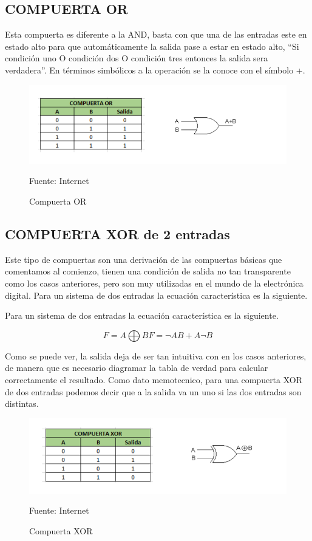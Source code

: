 \subsection{COMPUERTA OR}
Esta compuerta es diferente a la AND, basta con que una de las entradas este en estado alto para que automáticamente la salida pase a estar en estado alto, “Si condición uno O condición dos O condición tres entonces la salida sera verdadera”. En términos simbólicos a la operación se la conoce con el símbolo +.

\begin{figure}[H]
    \centering
    \includegraphics[scale = 0.7]{Imagenes/OR.png}
    \caption{Compuerta OR}{Fuente: Internet}
\end{figure}

\subsection{COMPUERTA XOR de 2 entradas}

Este tipo de compuertas son una derivación de las compuertas básicas que comentamos al comienzo, tienen una condición de salida no tan transparente como los casos anteriores, pero son muy utilizadas en el mundo de la electrónica digital.
Para un sistema de dos entradas la ecuación característica es la siguiente.

Para un sistema de dos entradas la ecuación característica es la siguiente.

\begin{equation}
    F = A \bigoplus B
    F = \neg A B +  A \neg B
\end{equation}

Como se puede ver, la salida deja de ser tan intuitiva con en los casos anteriores, de manera que es necesario diagramar la tabla de verdad para calcular correctamente el resultado.
Como dato memotecnico, para una compuerta XOR de dos entradas podemos decir que a la salida va un uno si las dos entradas son distintas.

\begin{figure}[H]
    \centering
    \includegraphics[scale = 0.70]{Imagenes/XOR.png}
    \caption{Compuerta XOR}{Fuente: Internet}
\end{figure}

